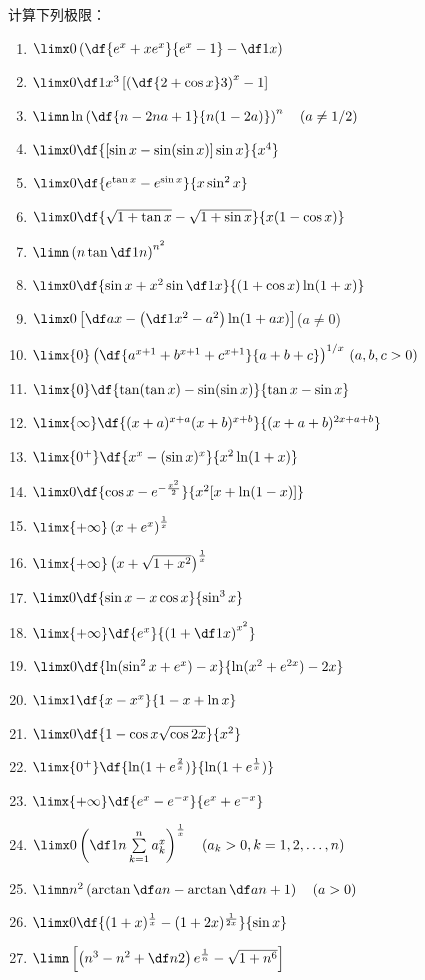 \begin{ext}
	计算下列极限：
	\begin{enumerate}[(1)]
		\item $\limx0\left(\df{e^x+xe^x}{e^x-1}-\df1x\right)$
		\item $\limx0\df1{x^3}\left[\left(\df{2+\cos x}3\right)^x-1\right]$
		\item $\limn\ln\left(\df{n-2na+1}{n(1-2a)}\right)^n\quad(a\ne1/2)$
		\item $\limx0\df{[\sin x-\sin(\sin x)]\sin x}{x^4}$
		\item $\limx0\df{e^{\tan x}-e^{\sin x}}{x\sin^2x}$
		\item $\limx0\df{\sqrt{1+\tan x}-\sqrt{1+\sin x}}{x(1-\cos x)}$
		\item $\limn\left(n\tan\df1n\right)^{n^2}$
		\item $\limx0\df{\sin x+x^2\sin\df1x}{(1+\cos x)\ln(1+x)}$
		\item $\limx0\left[\df
		  ax-\left(\df1{x^2}-a^2\right)\ln(1+ax)\right]$\quad($a\ne 0$)
		\item $\limx{0}\left(\df{a^{x+1}+b^{x+1}+c^{x+1}}{a+b+c}\right)^{1/x}
		  \,(a,b,c>0)$
		\item $\limx{0}\df{\tan(\tan x)-\sin(\sin x)}{\tan x-\sin x}$ 
		\item $\limx{\infty}\df{(x+a)^{x+a}(x+b)^{x+b}}{(x+a+b)^{2x+a+b}}$
		\item $\limx{0^+}\df{x^x-(\sin x)^x}{x^2\ln(1+x)}$
		\item $\limx0\df{\cos x-e^{-\frac{x^2}2}}{x^2[x+\ln(1-x)]}$
		\item $\limx{+\infty}\left(x+e^x\right)^{\frac1x}$
		\item $\limx{+\infty}\left(x+\sqrt{1+x^2}\right)^{\frac1x}$
		\item $\limx0\df{\sin x-x\cos x}{\sin^3x}$
		\item $\limx{+\infty}\df{e^x}{\left(1+\df1x\right)^{x^2}}$
		\item $\limx0\df{\ln(\sin^2x+e^x)-x}{\ln(x^2+e^{2x})-2x}$
		\item $\limx1\df{x-x^x}{1-x+\ln x}$
		\item $\limx0\df{1-\cos x\sqrt{\cos2x}}{x^2}$
		\item $\limx{0^+}\df{\ln(1+e^{\frac2x})}{\ln(1+e^{\frac1x})}$
		\item $\limx{+\infty}\df{e^x-e^{-x}}{e^x+e^{-x}}$
		\item $\limx0\left(\df1n\sum\limits_{k=1}^na_k^x\right)^{\frac1x}
		  \quad (a_k>0,k=1,2,\ldots,n)$
		\item $\limn n^2\left(\arctan\df an-\arctan\df a{n+1}\right)\quad (a>0)$
		\item $\limx0\df{(1+x)^{\frac1x}-(1+2x)^{\frac1{2x}}}{\sin x}$
		\item $\limn\left[\left(n^3-n^2+\df n2\right)e^{\frac1n}-\sqrt{1+n^6}\right]$
	  \end{enumerate}
\end{ext}

